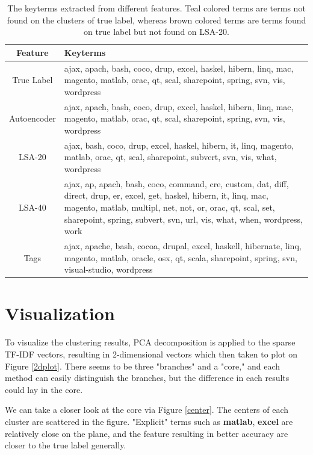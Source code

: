 \documentclass[12pt]{article}
\begin{document}
\begin{table}
  \label{keyterm}
  \noindent
  \newcommand{\diff}[1]{{\color{teal}#1}}
  \newcommand{\diffa}[1]{{\color{brown}#1}}
  \begin{tabular}{cm{}}
    Feature & Keyterms \\
    \hline \hline
    True Label &
    ajax, \diffa{apach}, bash, coco, drup, excel, haskel, hibern,
    linq, \diffa{mac}, magento, matlab, orac, qt, scal, sharepoint,
    \diffa{spring}, svn, vis, wordpress\\
    \hline
    Autoencoder&
    ajax, apach, bash, coco, drup, excel, haskel, hibern,
    linq, mac, magento, matlab, orac, qt, scal, sharepoint,
    spring, svn, vis, wordpress\\
    \hline
    LSA-20&
    ajax, bash, coco, drup, excel, haskel, hibern, \diff{it},
    linq, magento, matlab, orac, qt, scal, sharepoint,
    \diff{subvert}, svn, vis, \diff{what}, wordpress\\
    \hline
    LSA-40&
    ajax, \diff{ap}, apach, bash, coco,
    \diff{command}, \diff{cre}, \diff{custom}, \diff{dat},
    \diff{diff}, \diff{direct}, drup, \diff{er}, excel,
    \diff{get}, haskel, hibern, \diff{it}, linq, mac,
    magento, matlab, \diff{multipl}, \diff{net}, \diff{not},
    \diff{or}, orac, qt, scal, \diff{set}, sharepoint,
    spring, \diff{subvert}, svn, \diff{url}, vis, \diff{what},
    \diff{when}, wordpress, \diff{work}\\
    \space
    \hline \hline
    Tags &
    ajax, apache, bash, cocoa, drupal, excel, haskell, hibernate,
    linq, magento, matlab, oracle, osx, qt, scala, sharepoint,
    spring, svn, visual-studio, wordpress\\
    \hline
  \end{tabular}
  \caption{The keyterms extracted from different features.
  \diff{Teal} colored terms are terms not found on the
  clusters of true label, whereas \diffa{brown} colored
  terms are terms found on true label but not found on LSA-20.}
\end{table}

\section{Visualization}
  \par To visualize the clustering results, PCA decomposition
  is applied to the sparse TF-IDF vectors, resulting in
  2-dimensional vectors which then taken to plot on Figure \ref{2dplot}.
  There seems to be three "branches" and a "core," and each
  method can easily distinguish the branches, but the difference
  in each results could lay in the core.
  \par We can take a closer look at the core via Figure \ref{center}.
  The centers of each cluster are scattered in the figure.
  "Explicit" terms such as {\bf matlab}, {\bf excel} are
  relatively close on the plane, and the feature resulting
  in better accuracy are closer to the true label generally.
\end{document}
